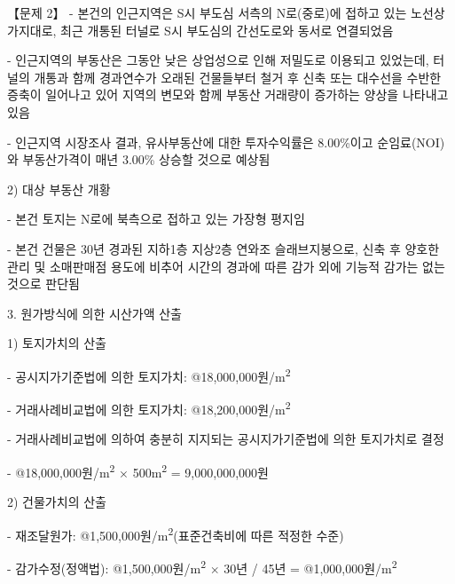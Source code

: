 \begin{longquestion}{【문제 2】}
\hspace*{1em}- 본건의 인근지역은 S시 부도심 서측의 N로(중로)에 접하고 있는 노선상가지대로, 최근 개통된 터널로 S시 부도심의 간선도로와 동서로 연결되었음 \par
\hspace*{1em}- 인근지역의 부동산은 그동안 낮은 상업성으로 인해 저밀도로 이용되고 있었는데, 터널의 개통과 함께 경과연수가 오래된 건물들부터 철거 후 신축 또는 대수선을 수반한 증축이 일어나고 있어 지역의 변모와 함께 부동산 거래량이 증가하는 양상을 나타내고 있음 \par
\hspace*{1em}- 인근지역 시장조사 결과, 유사부동산에 대한 투자수익률은 8.00\%이고 순임료(NOI)와 부동산가격이 매년 3.00\% 상승할 것으로 예상됨 \par
\hspace*{0.5em}2) 대상 부동산 개황 \par
\hspace*{1em}- 본건 토지는 N로에 북측으로 접하고 있는 가장형 평지임 \par
\hspace*{1em}- 본건 건물은 30년 경과된 지하1층 지상2층 연와조 슬래브지붕으로, 신축 후 양호한 관리 및 소매판매점 용도에 비추어 시간의 경과에 따른 감가 외에 기능적 감가는 없는 것으로 판단됨 \par
3. 원가방식에 의한 시산가액 산출 \par
\hspace*{0.5em}1) 토지가치의 산출 \par
\hspace*{1em}- 공시지가기준법에 의한 토지가치: @18,000,000원/m\textsuperscript{2} \par
\hspace*{1em}- 거래사례비교법에 의한 토지가치: @18,200,000원/m\textsuperscript{2} \par
\hspace*{1em}- 거래사례비교법에 의하여 충분히 지지되는 공시지가기준법에 의한 토지가치로 결정 \par
\hspace*{1em}- @18,000,000원/m\textsuperscript{2} $\times$ 500m\textsuperscript{2} = 9,000,000,000원 \par
\hspace*{0.5em}2) 건물가치의 산출 \par
\hspace*{1em}- 재조달원가: @1,500,000원/m\textsuperscript{2}(표준건축비에 따른 적정한 수준) \par
\hspace*{1em}- 감가수정(정액법): @1,500,000원/m\textsuperscript{2} $\times$ 30년 / 45년 = @1,000,000원/m\textsuperscript{2} \par

\end{longquestion}

